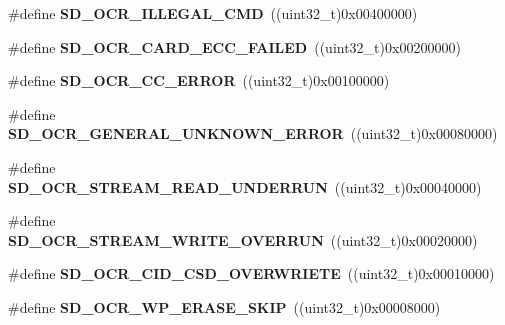 \begin{DoxyCompactItemize}
\item 
\#define {\bfseries S\+D\+\_\+\+O\+C\+R\+\_\+\+I\+L\+L\+E\+G\+A\+L\+\_\+\+C\+MD}~((uint32\+\_\+t)0x00400000)\hypertarget{group__sd__card__private_gaacbea47f6b504f11a696e9164d4eb7cd}{}\label{group__sd__card__private_gaacbea47f6b504f11a696e9164d4eb7cd}

\item 
\#define {\bfseries S\+D\+\_\+\+O\+C\+R\+\_\+\+C\+A\+R\+D\+\_\+\+E\+C\+C\+\_\+\+F\+A\+I\+L\+ED}~((uint32\+\_\+t)0x00200000)\hypertarget{group__sd__card__private_ga1631f9e745f1f6c1ded6fba841a05a3d}{}\label{group__sd__card__private_ga1631f9e745f1f6c1ded6fba841a05a3d}

\item 
\#define {\bfseries S\+D\+\_\+\+O\+C\+R\+\_\+\+C\+C\+\_\+\+E\+R\+R\+OR}~((uint32\+\_\+t)0x00100000)\hypertarget{group__sd__card__private_ga3530c6edf8d326b2d72a8a7fb488957b}{}\label{group__sd__card__private_ga3530c6edf8d326b2d72a8a7fb488957b}

\item 
\#define {\bfseries S\+D\+\_\+\+O\+C\+R\+\_\+\+G\+E\+N\+E\+R\+A\+L\+\_\+\+U\+N\+K\+N\+O\+W\+N\+\_\+\+E\+R\+R\+OR}~((uint32\+\_\+t)0x00080000)\hypertarget{group__sd__card__private_ga11edb9b3be6266ffb00b9a507e3b9fff}{}\label{group__sd__card__private_ga11edb9b3be6266ffb00b9a507e3b9fff}

\item 
\#define {\bfseries S\+D\+\_\+\+O\+C\+R\+\_\+\+S\+T\+R\+E\+A\+M\+\_\+\+R\+E\+A\+D\+\_\+\+U\+N\+D\+E\+R\+R\+UN}~((uint32\+\_\+t)0x00040000)\hypertarget{group__sd__card__private_ga26270305d70e7d17a8bde14c15378bfd}{}\label{group__sd__card__private_ga26270305d70e7d17a8bde14c15378bfd}

\item 
\#define {\bfseries S\+D\+\_\+\+O\+C\+R\+\_\+\+S\+T\+R\+E\+A\+M\+\_\+\+W\+R\+I\+T\+E\+\_\+\+O\+V\+E\+R\+R\+UN}~((uint32\+\_\+t)0x00020000)\hypertarget{group__sd__card__private_ga3b9973ae82de6ca9acb76444a9204407}{}\label{group__sd__card__private_ga3b9973ae82de6ca9acb76444a9204407}

\item 
\#define {\bfseries S\+D\+\_\+\+O\+C\+R\+\_\+\+C\+I\+D\+\_\+\+C\+S\+D\+\_\+\+O\+V\+E\+R\+W\+R\+I\+E\+TE}~((uint32\+\_\+t)0x00010000)\hypertarget{group__sd__card__private_ga5a2a4ac30f0b473c87f283c9b25508c7}{}\label{group__sd__card__private_ga5a2a4ac30f0b473c87f283c9b25508c7}

\item 
\#define {\bfseries S\+D\+\_\+\+O\+C\+R\+\_\+\+W\+P\+\_\+\+E\+R\+A\+S\+E\+\_\+\+S\+K\+IP}~((uint32\+\_\+t)0x00008000)\hypertarget{group__sd__card__private_gafe54250dcb2461950611828b409b8c42}{}\label{group__sd__card__private_gafe54250dcb2461950611828b409b8c42}


\end{DoxyCompactItemize}
